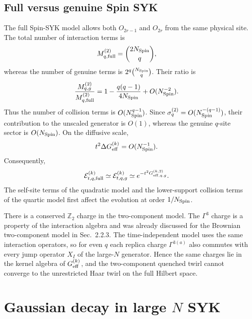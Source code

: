 \documentclass{article}
\theoremstyle{definition}
\begin{document}
\subsection{Full versus genuine Spin SYK}

The full Spin-SYK model allows both $O_{2r-1}$ and $O_{2r}$ from the same
physical site.  The total number of interaction terms is
\begin{equation}
    M_{q,{\rm full}}^{(2)}=\binom{2N_{\rm Spin}}q,
\end{equation}
whereas the number of genuine terms is
$2^q\binom{N_{\rm Spin}}q$.  Their ratio is
\begin{equation}
    \frac{M_{q,g}^{(2)}}{M_{q,{\rm full}}^{(2)}}
    =1-\frac{q(q-1)}{4N_{\rm Spin}}
     +O(N_{\rm Spin}^{-2}).
\end{equation}
Thus the number of collision terms is $O(N_{\rm Spin}^{q-1})$.  Since
$\sigma_q^{(2)}=O(N_{\rm Spin}^{-(q-1)})$, their contribution to the
unscaled generator is $O(1)$, whereas the genuine $q$-site sector is
$O(N_{\rm Spin})$.  On the diffusive scale,
\begin{equation}
    t^2\Delta G_{\rm eff}^{(k)}=O(N_{\rm Spin}^{-1}).
\end{equation}
Consequently,
\begin{equation}
    {\cal E}_{t,q,{\rm full}}^{(k)}
    \simeq {\cal E}_{t,q,g}^{(k)}
    \simeq e^{-t^2G_{{\rm eff},q,g}^{(k,2)}}.
\end{equation}
The self-site terms of the quadratic model and the lower-support collision
terms of the quartic model first affect the evolution at order
$1/N_{\rm Spin}$.

There is a conserved $\mathbb Z_2$ charge in the two-component model. The $\Gamma^3$ charge is a property of the interaction algebra and was
already discussed for the Brownian two-component model in Sec.~2.2.3.
The time-independent model uses the same interaction operators, so for
even $q$ each replica charge $\Gamma^{3(a)}$ also commutes with every jump
operator $X_I$ of the large-$N$ generator.  Hence the same charges lie in
the kernel algebra of $G_{\rm eff}^{(k)}$, and the two-component quenched
twirl cannot converge to the unrestricted Haar twirl on the full Hilbert
space.

\section{Gaussian decay in large $N$ SYK}
\label{sec:largeN_SYK}
\end{document}
